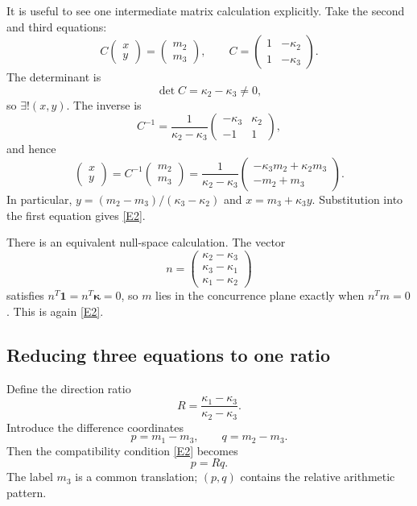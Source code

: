 \documentclass[12pt]{article}
\begin{document}
It is useful to see one intermediate matrix calculation explicitly. Take the second and third equations:
\[
C\begin{pmatrix}x\\y\end{pmatrix}=
\begin{pmatrix}m_2\\m_3\end{pmatrix},
\qquad
C=\begin{pmatrix}1&-\kappa_2\\1&-\kappa_3\end{pmatrix}.
\]
The determinant is
\[
\det C=\kappa_2-\kappa_3\neq0,
\]
so $\exists!(x,y)$. The inverse is
\[
C^{-1}=\frac1{\kappa_2-\kappa_3}
\begin{pmatrix}-\kappa_3&\kappa_2\\-1&1\end{pmatrix},
\]
and hence
\begin{equation}\tag{E3}\label{E3}
\begin{pmatrix}x\\y\end{pmatrix}
=
C^{-1}\begin{pmatrix}m_2\\m_3\end{pmatrix}
=\frac1{\kappa_2-\kappa_3}
\begin{pmatrix}
-\kappa_3m_2+\kappa_2m_3\\-m_2+m_3
\end{pmatrix}.
\end{equation}
In particular,
$y=(m_2-m_3)/(\kappa_3-\kappa_2)$ and
$x=m_3+\kappa_3y$. Substitution into the first equation gives \eqref{E2}.

There is an equivalent null-space calculation. The vector
\[
n=
\begin{pmatrix}
\kappa_2-\kappa_3\\
\kappa_3-\kappa_1\\
\kappa_1-\kappa_2
\end{pmatrix}
\]
satisfies $n^T\mathbf1=n^T\boldsymbol\kappa=0$, so $m$ lies in the concurrence plane exactly when $n^Tm=0$. This is again \eqref{E2}.

\subsection{Reducing three equations to one ratio}
Define the direction ratio
\begin{equation}\tag{E4}\label{E4}
R=\frac{\kappa_1-\kappa_3}{\kappa_2-\kappa_3}.
\end{equation}
Introduce the difference coordinates
\[
p=m_1-m_3,
\qquad
q=m_2-m_3.
\]
Then the compatibility condition \eqref{E2} becomes
\begin{equation}\tag{E5}\label{E5}
p=Rq.
\end{equation}
The label $m_3$ is a common translation; $(p,q)$ contains the relative arithmetic pattern.
\end{document}
